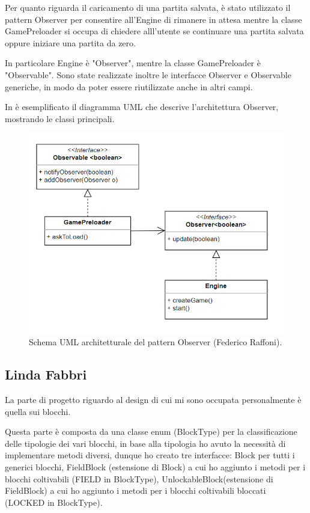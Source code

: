 \documentclass[a4paper,12pt]{report}
\begin{document}
Per quanto riguarda il caricamento di una partita salvata, è stato utilizzato il pattern Observer per consentire all’Engine di rimanere in attesa mentre la classe GamePreloader si occupa di chiedere alll’utente se continuare una partita salvata oppure iniziare una partita da zero.

In particolare Engine è "Observer", mentre la classe GamePreloader è "Observable".  Sono state realizzate inoltre le interfacce Observer e Observable generiche, in modo da poter essere riutilizzate anche in altri campi.

 In  è esemplificato il diagramma UML che descrive l'architettura Observer, mostrando le classi principali.

\hfill\break
\begin{figure}[!htb]
	\centering{}
	\includegraphics[width=\textwidth]{img/UML_ObserverRaffo.png}
	\caption{Schema UML architetturale del pattern Observer (Federico Raffoni).}
	\label{img:FedericoRaffoni_Observer}
\end{figure}

\subsection{Linda Fabbri}
La parte di progetto riguardo al design di cui mi sono occupata personalmente è quella sui blocchi. 

Questa parte è composta da una classe enum (BlockType) per la classificazione delle tipologie dei vari blocchi, in base alla tipologia ho avuto la necessità di implementare metodi diversi, dunque ho creato tre interfacce: Block per tutti i generici blocchi, FieldBlock (estensione di Block) a cui ho aggiunto i metodi per i blocchi coltivabili (FIELD in BlockType), UnlockableBlock(estensione di FieldBlock) a cui ho aggiunto i metodi per i blocchi coltivabili bloccati (LOCKED in BlockType).
\end{document}
